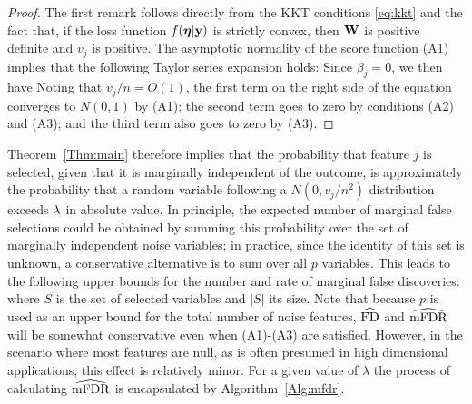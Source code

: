 \begin{proof}
  The first remark follows directly from the KKT conditions \eqref{eq:kkt} and the fact that, if the loss function $f(\boldsymbol{\eta}|\mathbf{y})$ is strictly convex, then $\mathbf{W}$ is positive definite and $v_j$ is positive.  The asymptotic normality of the score function (A1) implies that the following Taylor series expansion holds:
Since $\beta_j=0$, we then have
Noting that $v_j/n=O(1)$, the first term on the right side of the equation converges to $N(0,1)$ by (A1); the second term goes to zero by conditions (A2) and (A3); and the third term also goes to zero by (A3).
\end{proof}

Theorem~\ref{Thm:main} therefore implies that the probability that feature $j$ is selected, given that it is marginally independent of the outcome, is approximately the probability that a random variable following a $N(0, v_j/n^2)$ distribution exceeds $\lambda$ in absolute value.
In principle, the expected number of marginal false selections could be obtained by summing this probability over the set of marginally independent noise variables; in practice, since the identity of this set is unknown, a conservative alternative is to sum over all $p$ variables.
This leads to the following upper bounds for the number and rate of marginal false discoveries:
where $S$ is the set of selected variables and $|S|$ its size.  Note that because $p$ is used as an upper bound for the total number of noise features, $\widehat{\textrm{FD}}$ and $\widehat{\textrm{mFDR}}$ will be somewhat conservative even when (A1)-(A3) are satisfied.  However, in the scenario where most features are null, as is often presumed in high dimensional applications, this effect is relatively minor.  For a given value of $\lambda$ the process of calculating $\widehat{\textrm{mFDR}}$ is encapsulated by Algorithm~\ref{Alg:mfdr}.


